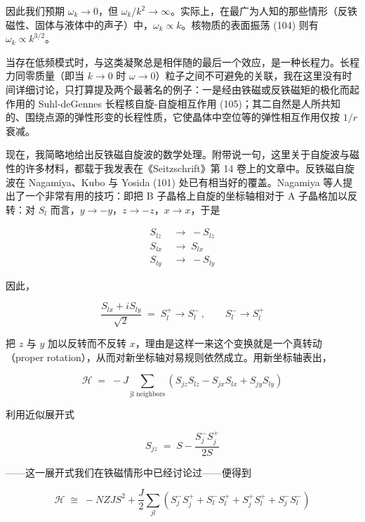 因此我们预期 $\omega_k\to 0$，但 $\omega_k/k^2\to\infty$。实际上，在最广为人知的那些情形（反铁磁性、固体与液体中的声子）中，$\omega_k\propto k$。核物质的表面振荡 (104) 则有 $\omega_k\propto k^{3/2}$。

当存在低频模式时，与这类凝聚总是相伴随的最后一个效应，是一种长程力。长程力同零质量（即当 $k\to 0$ 时 $\omega\to 0$）粒子之间不可避免的关联，我在这里没有时间详细讨论，只打算提及两个最著名的例子：一是经由铁磁或反铁磁矩的极化而起作用的 Suhl-deGennes 长程核自旋-自旋相互作用 (105)；其二自然是人所共知的、围绕点源的弹性形变的长程性质，它使晶体中空位等的弹性相互作用仅按 $1/r$ 衰减。

现在，我简略地给出反铁磁自旋波的数学处理。附带说一句，这里关于自旋波与磁性的许多材料，都载于我发表在《Seitzschrift》第 14 卷上的文章中。反铁磁自旋波在 Nagamiya、Kubo 与 Yosida (101) 处已有相当好的覆盖。Nagamiya 等人提出了一个非常有用的技巧：即把 B 子晶格上自旋的坐标轴相对于 A 子晶格加以反转：对 $S_l$ 而言，$y\to -y$，$z\to -z$，$x\to x$，于是

\begin{align*}
S_{lz} \;&\to\; -S_{lz}\\
S_{lx} \;&\to\; S_{lx}\\
S_{ly} \;&\to\; -S_{ly}
\end{align*}

因此，

\begin{equation*}
\frac{S_{lx}+iS_{ly}}{\sqrt{2}} \;=\; S_l^+ \longrightarrow S_l^-\,,\qquad S_l^- \longrightarrow S_l^+
\end{equation*}

把 $z$ 与 $y$ 加以反转而不反转 $x$，理由是这样一来这个变换就是一个真转动（proper rotation），从而对新坐标轴对易规则依然成立。用新坐标轴表出，

\begin{equation*}
\mathcal{H} \;=\; -J\sum_{\text{jl neighbors}} \left(S_{jz}S_{lz} - S_{jx}S_{lx} + S_{jy}S_{ly}\right)
\end{equation*}

利用近似展开式

\begin{equation*}
S_{jz} \;=\; S - \frac{S_j^- S_j^+}{2S}
\end{equation*}

——这一展开式我们在铁磁情形中已经讨论过——便得到

\begin{equation*}
\mathcal{H} \;\cong\; -NZJS^2 + \frac{J}{2}\sum_{jl}\left(S_j^- S_j^+ + S_l^- S_l^+ + S_j^+ S_l^+ + S_j^- S_l^-\right)
\end{equation*}

